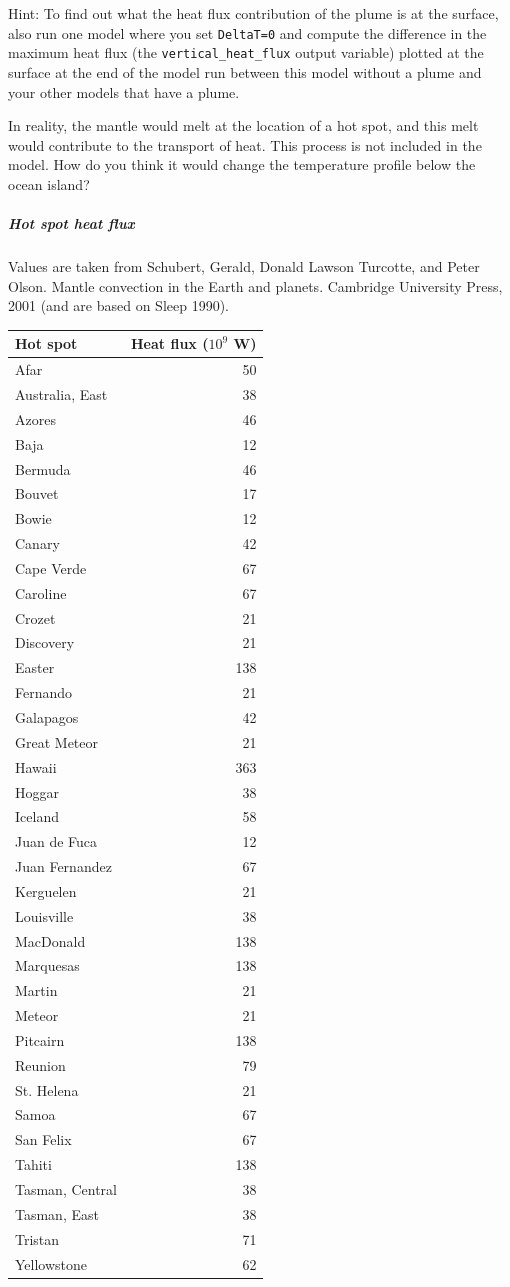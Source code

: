 Hint: To find out what the heat flux contribution of the plume is at the surface, also run one model where you set \texttt{DeltaT=0} and compute the difference in the maximum heat flux (the \texttt{vertical\_heat\_flux} output variable) plotted at the surface at the end of the model run between this model without a plume and your other models that have a plume. 

In reality, the mantle would melt at the location of a hot spot, and this melt would contribute to the transport of heat. This process is not included in the model. How do you think it would change the temperature profile below the ocean island?

\subparagraph{Hot spot heat flux}
\label{sec:heat-flux-table}

Values are taken from Schubert, Gerald, Donald Lawson Turcotte, and Peter Olson. Mantle convection in the Earth and planets. Cambridge University Press, 2001 (and are based on Sleep 1990).

\begin{tabular}{ l | r }
\hline
\hline  
Hot spot & Heat flux ($10^9$ W) \\
\hline  
Afar & 50 \\
Australia, East & 38 \\
Azores & 46 \\
Baja & 12  \\
Bermuda & 46 \\
Bouvet & 17 \\
Bowie & 12 \\
Canary & 42 \\
Cape Verde & 67 \\
Caroline & 67 \\
Crozet & 21 \\
Discovery & 21 \\
Easter & 138 \\
Fernando & 21 \\
Galapagos & 42 \\
Great Meteor & 21 \\
Hawaii & 363 \\
Hoggar & 38 \\
Iceland & 58 \\
Juan de Fuca & 12 \\
Juan Fernandez & 67 \\
Kerguelen & 21 \\
Louisville & 38 \\
MacDonald & 138 \\
Marquesas & 138 \\
Martin & 21 \\
Meteor & 21 \\
Pitcairn & 138 \\
Reunion & 79 \\
St. Helena & 21 \\
Samoa & 67 \\
San Felix & 67 \\
Tahiti & 138 \\
Tasman, Central & 38 \\
Tasman, East & 38 \\
Tristan & 71 \\
Yellowstone & 62 \\
\hline  
\hline  
\end{tabular}
